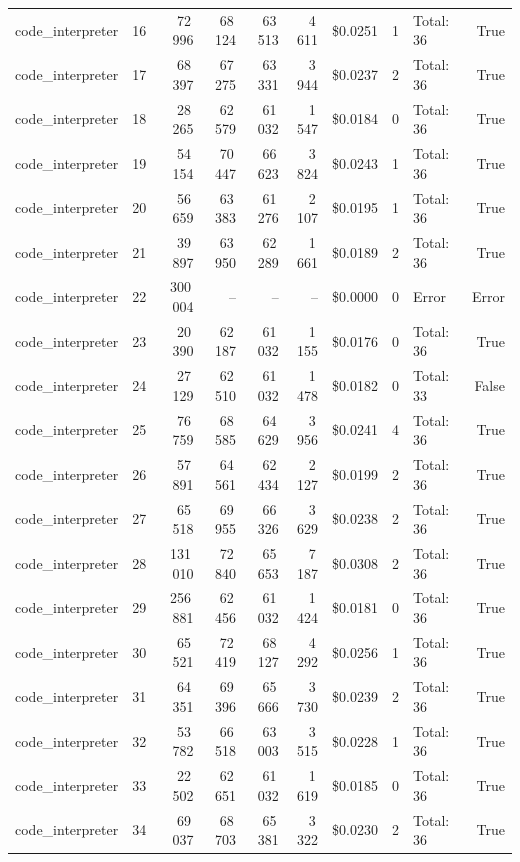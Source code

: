 \documentclass[a4paper,11pt]{article}
\begin{document}
\begin{table}[H]
{\begin{tabular}{l r r r r r r r l r}
code\_interpreter & 16 & 72\,996 & 68\,124 & 63\,513 & 4\,611 & \$0.0251 & 1 & Total: 36 & True \\
code\_interpreter & 17 & 68\,397 & 67\,275 & 63\,331 & 3\,944 & \$0.0237 & 2 & Total: 36 & True \\
code\_interpreter & 18 & 28\,265 & 62\,579 & 61\,032 & 1\,547 & \$0.0184 & 0 & Total: 36 & True \\
code\_interpreter & 19 & 54\,154 & 70\,447 & 66\,623 & 3\,824 & \$0.0243 & 1 & Total: 36 & True \\
code\_interpreter & 20 & 56\,659 & 63\,383 & 61\,276 & 2\,107 & \$0.0195 & 1 & Total: 36 & True \\
code\_interpreter & 21 & 39\,897 & 63\,950 & 62\,289 & 1\,661 & \$0.0189 & 2 & Total: 36 & True \\
code\_interpreter & 22 & 300\,004 & -- & -- & -- & \$0.0000 & 0 & Error & Error \\
code\_interpreter & 23 & 20\,390 & 62\,187 & 61\,032 & 1\,155 & \$0.0176 & 0 & Total: 36 & True \\
code\_interpreter & 24 & 27\,129 & 62\,510 & 61\,032 & 1\,478 & \$0.0182 & 0 & Total: 33 & False \\
code\_interpreter & 25 & 76\,759 & 68\,585 & 64\,629 & 3\,956 & \$0.0241 & 4 & Total: 36 & True \\
code\_interpreter & 26 & 57\,891 & 64\,561 & 62\,434 & 2\,127 & \$0.0199 & 2 & Total: 36 & True \\
code\_interpreter & 27 & 65\,518 & 69\,955 & 66\,326 & 3\,629 & \$0.0238 & 2 & Total: 36 & True \\
code\_interpreter & 28 & 131\,010 & 72\,840 & 65\,653 & 7\,187 & \$0.0308 & 2 & Total: 36 & True \\
code\_interpreter & 29 & 256\,881 & 62\,456 & 61\,032 & 1\,424 & \$0.0181 & 0 & Total: 36 & True \\
code\_interpreter & 30 & 65\,521 & 72\,419 & 68\,127 & 4\,292 & \$0.0256 & 1 & Total: 36 & True \\
code\_interpreter & 31 & 64\,351 & 69\,396 & 65\,666 & 3\,730 & \$0.0239 & 2 & Total: 36 & True \\
code\_interpreter & 32 & 53\,782 & 66\,518 & 63\,003 & 3\,515 & \$0.0228 & 1 & Total: 36 & True \\
code\_interpreter & 33 & 22\,502 & 62\,651 & 61\,032 & 1\,619 & \$0.0185 & 0 & Total: 36 & True \\
code\_interpreter & 34 & 69\,037 & 68\,703 & 65\,381 & 3\,322 & \$0.0230 & 2 & Total: 36 & True \\

\end{tabular}}
\end{table}
\end{document}
